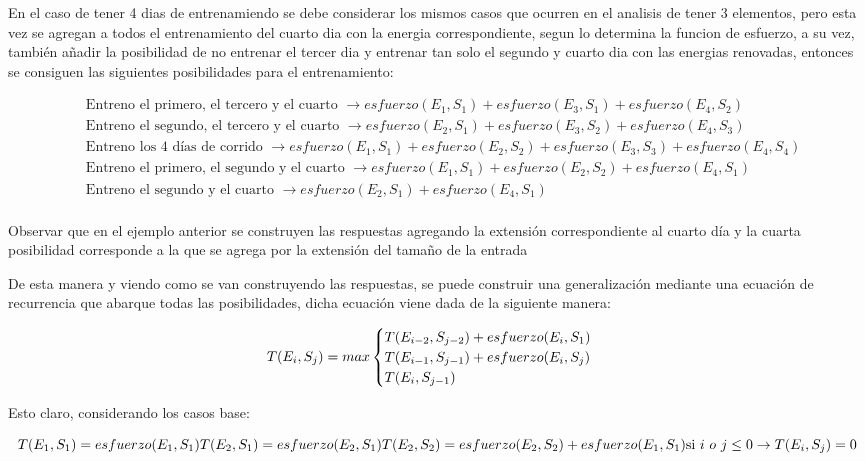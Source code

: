 En el caso de tener 4 dias de entrenamiendo se debe considerar los mismos casos que ocurren en el analisis de tener 3 elementos, pero esta vez se agregan a todos el entrenamiento del cuarto dia con la energia correspondiente, segun lo determina la funcion de esfuerzo, a su vez, también añadir la posibilidad de no entrenar el tercer dia y entrenar tan solo el segundo y cuarto dia con las energias renovadas, entonces se consiguen las siguientes posibilidades para el entrenamiento:

$$
\begin{align*}
&\text{Entreno el primero, el tercero y el cuarto } \rightarrow esfuerzo(E_1, S_1) + esfuerzo(E_3, S_1) + esfuerzo(E_4, S_2)\\
&\text{Entreno el segundo, el tercero y el cuarto } \rightarrow esfuerzo(E_2, S_1) + esfuerzo(E_3, S_2) + esfuerzo(E_4, S_3)\\
&\text{Entreno los 4 días de corrido } \rightarrow esfuerzo(E_1, S_1) + esfuerzo(E_2, S_2) + esfuerzo(E_3, S_3) + esfuerzo(E_4, S_4)\\
&\text{Entreno el primero, el segundo y el cuarto } \rightarrow esfuerzo(E_1, S_1) + esfuerzo(E_2, S_2) + esfuerzo(E_4, S_1)\\
&\text{Entreno el segundo y el cuarto } \rightarrow esfuerzo(E_2, S_1)+ esfuerzo(E_4, S_1)\\
\end{align*}
$$

Observar que en el ejemplo anterior se construyen las respuestas agregando la extensión correspondiente al cuarto día y la cuarta posibilidad corresponde a la que se agrega por la extensión del tamaño de la entrada

De esta manera y viendo como se van construyendo las respuestas, se puede construir una generalización mediante una ecuación de recurrencia que abarque todas las posibilidades, dicha ecuación viene dada de la siguiente manera:

$$
\\
T(E_i, S_j) = max\begin{cases}
  T(E_{i-2}, S_{j-2}) + esfuerzo(E_{i}, S_1) \\
  T(E_{i-1}, S_{j-1}) + esfuerzo(E_i,S_j) \\
  T(E_i, S_{j-1})                                          
\end{cases} 
\\
$$

Esto claro, considerando los casos base:

$$
T(E_1, S_1) = esfuerzo(E_1, S_1) \\
T(E_2, S_1) = esfuerzo(E_2, S_1) \\ 
T(E_2, S_2) = esfuerzo(E_2, S_2) + esfuerzo(E_1, S_1)\\
\text{si } i \ o \ j \le 0 \rightarrow T(E_i, S_j) = 0
$$
